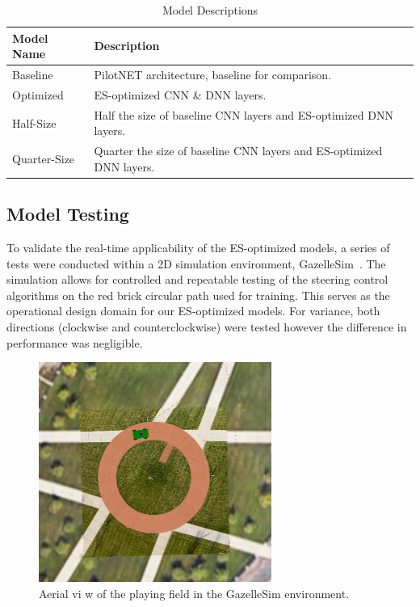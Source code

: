 \documentclass[conference]{IEEEtran}
\begin{document}
\begin{table}[ht]
    \centering
    \caption{Model Descriptions}
    \begin{tabular}{p{0.75in}|p{2.25in}}

        \textbf{Model Name} & \textbf{Description}                                                 \\
        \hline
        Baseline            & PilotNET architecture, baseline for comparison.                      \\
        Optimized           & ES-optimized CNN \& DNN layers.                                      \\
        Half-Size           & Half the size of baseline CNN layers and ES-optimized DNN layers.    \\
        Quarter-Size        & Quarter the size of baseline CNN layers and ES-optimized DNN layers. \\
    \end{tabular}
    \label{tab:aliases}
\end{table}

\subsection{Model Testing}

To validate the real-time applicability of the ES-optimized models, a series of tests were conducted within a 2D simulation environment, GazelleSim~\cite{gazelle_sim}. The simulation allows for controlled and repeatable testing of the steering control algorithms on the red brick circular path used for training. This serves as the operational design domain for our ES-optimized models. For variance, both directions (clockwise and counterclockwise) were tested however the difference in performance was negligible.

\begin{figure}[ht]
    \centering
    \includegraphics[width=3in]{assets/Gazelle-Playing-Field.png}
    \caption{ Aerial vi w of the playing field in the GazelleSim environment.}
    \label{fig:field}
\end{figure}
\end{document}
